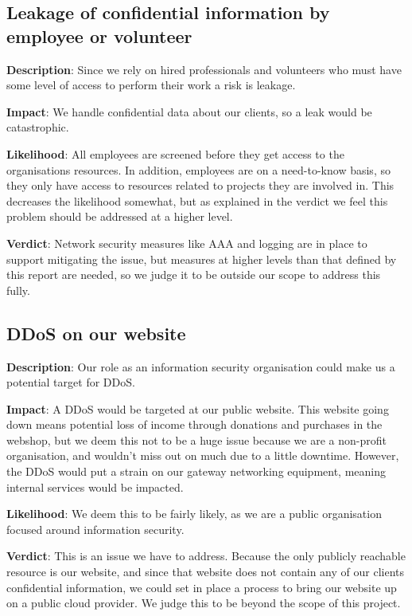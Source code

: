 \subsection{Leakage of confidential information by employee or volunteer}

\textbf{Description}: Since we rely on hired professionals and volunteers who must have some level of access to perform their work a risk is leakage.

\textbf{Impact}: We handle confidential data about our clients, so a leak would be catastrophic.

\textbf{Likelihood}: All employees are screened before they get access to the organisations resources. In addition, employees are on a need-to-know basis, so they only have access to resources related to projects they are involved in. This decreases the likelihood somewhat, but as explained in the verdict we feel this problem should be addressed at a higher level.

\textbf{Verdict}: Network security measures like AAA and logging are in place to support mitigating the issue, but measures at higher levels than that defined by this report are needed, so we judge it to be outside our scope to address this fully.

\subsection{DDoS on our website}

\textbf{Description}: Our role as an information security organisation could make us a potential target for DDoS.

\textbf{Impact}: A DDoS would be targeted at our public website. This website going down means potential loss of income through donations and purchases in the webshop, but we deem this not to be a huge issue because we are a non-profit organisation, and wouldn't miss out on much due to a little downtime. However, the DDoS would put a strain on our gateway networking equipment, meaning internal services would be impacted.

\textbf{Likelihood}: We deem this to be fairly likely, as we are a public organisation focused around information security.

\textbf{Verdict}: This is an issue we have to address. Because the only publicly reachable resource is our website, and since that website does not contain any of our clients confidential information, we could set in place a process to bring our website up on a public cloud provider. We judge this to be beyond the scope of this project.


